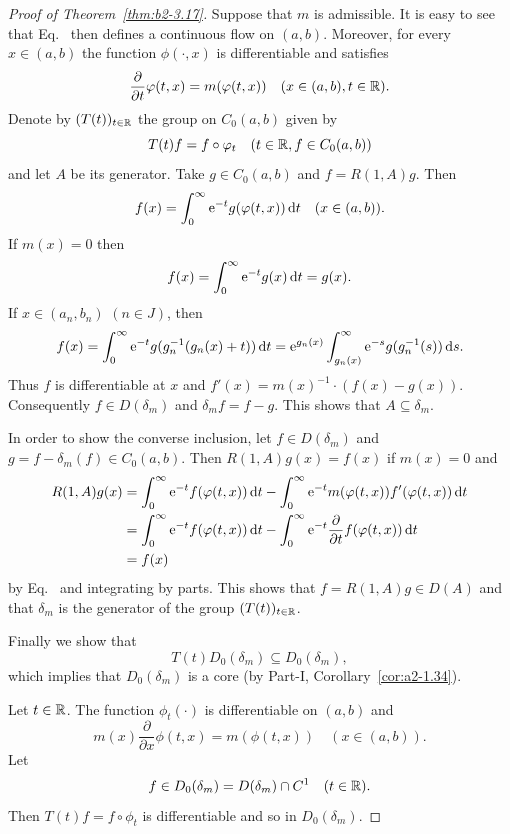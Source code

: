 \begin{proof}[Proof of Theorem~\ref{thm:b2-3.17}]
Suppose that $m$ is admissible.
It is easy to see that Eq.~ then defines a continuous flow on $(a,b)$.
Moreover, for every $x \in (a,b)$ the function $\phi(\cdot,x)$ is differentiable and satisfies
\begin{equation}\label{eq:b2-3.23}
\frac{\partial}{\partial t}\phi(t,x) = m(\phi(t,x)) \quad (x \in (a,b), t \in \R).
\end{equation}
Denote by $(T(t))_{t \in \mathbb{R}}$ the group on $C_{0}(a,b)$ given by 
%
\[
	T(t)f = f \circ \phi_{t} \quad (t \in \R, f \in C_{0}(a,b)) 
\]
%
and let $A$ be its generator.
Take $g \in C_{0}(a,b)$ and $f = R(1,A)g$.
Then %
\[
	f(x) = \int_{0}^{\infty} \eu^{-t}g(\phi(t,x)) \dt \quad (x \in (a,b)).
\]
%
If\/ $m(x) = 0$ then 
%
\[
	f(x) = \int_{0}^{\infty} \mathrm{e}^{-t}g(x) \mathop{}\!\mathrm{d}{t} = g(x) .
\]
%
If\/ $x \in (a_{n},b_{n})$ $(n \in J)$, then 
\[
f(x) = \int_{0}^{\infty} \mathrm{e}^{-t}g(g_{n}^{-1}(g_{n}(x) + t)) \mathop{}\!\mathrm{d}{t} = \mathrm{e}^{g_{n}(x)} \int_{g_{n}(x)}^{\infty} \mathrm{e}^{-s}g(g_{n}^{-1}(s)) \mathop{}\!\mathrm{d}{s}.
\]
Thus $f$ is differentiable at $x$ and $f'(x) = m(x)^{-1} \cdot (f(x) - g(x))$.
Consequently $f \in D(\delta_{m})$ and $\delta_{m}f = f - g$.
This shows that $A \subseteq \delta_{m}$.

In order to show the converse inclusion, let $f \in D(\delta_{m})$ and $g = f - \delta_{m}(f) \in C_{0}(a,b)$.
Then $R(1,A)g(x) = f(x)$ if\/ $m(x) = 0$ and 
\begin{align*}
R(1,A)g(x) &= \int_{0}^{\infty} \eu^{-t}f(\phi(t,x)) \dt - \int_{0}^{\infty} \eu^{-t}m(\phi(t,x))f'(\phi(t,x)) \dt \\
           &= \int_{0}^{\infty} \eu^{-t}f(\phi(t,x)) \dt - \int_{0}^{\infty} \eu^{-t}\frac{\partial}{\partial t}f(\phi(t,x)) \dt 
           \\
           &= f(x) 
\end{align*}
by  Eq.~ and integrating by parts.
This shows that $f = R(1,A)g \in D(A)$ and that $\delta_{m}$ is the generator of the group $(T(t))_{t \in \mathbb{R}}$.

Finally we show that 
%
\[
	T(t)D_{0}(\delta_{m}) \subseteq D_{0}(\delta_{m}),
\]
%
which implies that $D_{0}(\delta_{m})$ is a core (by Part-I, Corollary~\ref{cor:a2-1.34}).

Let $t \in \mathbb{R}$.
The function $\phi_{t}(\cdot)$ is
differentiable on $(a,b)$ and 
%
\[
	m(x)\frac{\partial}{\partial x}\phi(t,x) = m(\phi(t,x)) \quad (x \in (a,b)).
\]
%
Let 
%
\[
	f \in D_{0}(\delta_{m}) = D(\delta_{m}) \cap C^{1} \quad (t \in \mathbb{R}) .
\]
%
Then $T(t)f = f \circ \phi_{t}$ is differentiable and so in $D_{0}(\delta_{m})$.


\end{proof}
